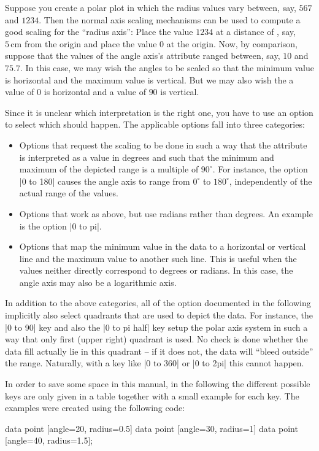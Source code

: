 Suppose you create a polar plot in which the radius values vary between, say,
$567$ and $1234$. Then the normal axis scaling mechanisms can be used to
compute a good scaling for the ``radius axis'': Place the value $1234$ at a
distance of , say, $5\,\mathrm{cm}$ from the origin and place the value $0$ at
the origin. Now, by comparison, suppose that the values of the angle axis's
attribute ranged between, say, $10$ and $75.7$. In this case, we may wish the
angles to be scaled so that the minimum value is horizontal and the maximum
value is vertical. But we may also wish the a value of $0$ is horizontal and a
value of $90$ is vertical.

Since it is unclear which interpretation is the right one, you have to use an
option to select which should happen. The applicable options fall into three
categories:
%
\begin{itemize}
    \item Options that request the scaling to be done in such a way that the
        attribute is interpreted as a value in degrees and such that the
        minimum and maximum of the depicted range is a multiple of $90^\circ$.
        For instance, the option |0 to 180| causes the angle axis to range from
        $0^\circ$ to $180^\circ$, independently of the actual range of the
        values.
    \item Options that work as above, but use radians rather than degrees. An
        example is the option |0 to pi|.
    \item Options that map the minimum value in the data to a horizontal or
        vertical line and the maximum value to another such line. This is
        useful when the values neither directly correspond to degrees or
        radians. In this case, the angle axis may also be a logarithmic axis.
\end{itemize}

In addition to the above categories, all of the option documented in the
following implicitly also select quadrants that are used to depict the data.
For instance, the |0 to 90| key and also the |0 to pi half| key setup the polar
axis system in such a way that only first (upper right) quadrant is used. No
check is done whether the data fill actually lie in this quadrant -- if it does
not, the data will ``bleed outside'' the range. Naturally, with a key like
|0 to 360| or |0 to 2pi| this cannot happen.

In order to save some space in this manual, in the following the different
possible keys are only given in a table together with a small example for each
key. The examples were created using the following code:
%
\begin{codeexample}[]
\tikz \datavisualization [
  scientific polar axes={
    clean,
    0 to 90  %
  },
  angle axis={ticks={step=30}},
  radius axis={length=1cm, ticks={step=1}},
  visualize as scatter]
data point [angle=20, radius=0.5]
data point [angle=30, radius=1]
data point [angle=40, radius=1.5];
\end{codeexample}

